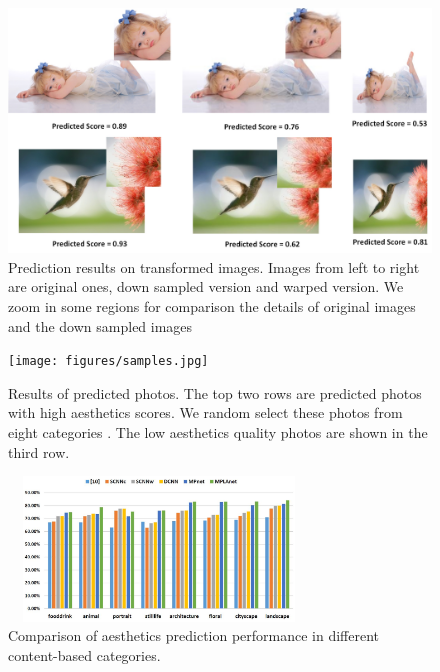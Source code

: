 \documentclass[10pt,twocolumn,letterpaper]{article}
\begin{document}
\begin{figure}
	\centering
	\includegraphics[scale=0.18]{figures/expr_transform.jpg}
	\caption{Prediction results on transformed images. Images from left to right are original ones, down sampled version and warped version. We zoom in some regions for comparison the details of original images and the down sampled images }
	\label{trans_img}	
	\vspace{-3mm}
\end{figure}


\begin{figure}
	\centering
	\texttt{[image: figures/samples.jpg]}
	\caption{Results of predicted photos. The top two rows are predicted photos with high aesthetics scores. We random select these photos from eight categories \cite{Murray:MMP2012:AVA}. The low aesthetics quality photos are shown in the third row.}
	\label{samples}
	\vspace{-1mm}
\end{figure}

\begin{figure} [!t]
	\centering
	\includegraphics[width=8cm, height=3.85cm]{figures/category.jpg}
	\caption{Comparison of aesthetics prediction performance in different content-based categories.}
	\label{category}
	\vspace{-3mm}
\end{figure}
\end{document}
